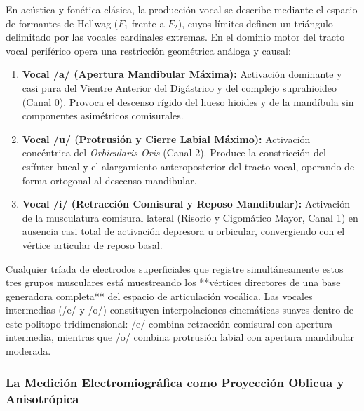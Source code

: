\documentclass[11pt,a4paper,openany]{book}
\theoremstyle{definition}
\begin{document}
En acústica y fonética clásica, la producción vocal se describe mediante el espacio de formantes de Hellwag ($F_1$ frente a $F_2$), cuyos límites definen un triángulo delimitado por las vocales cardinales extremas. En el dominio motor del tracto vocal periférico opera una restricción geométrica análoga y causal:
\begin{enumerate}
    \item \textbf{Vocal /a/ (Apertura Mandibular Máxima):} Activación dominante y casi pura del Vientre Anterior del Digástrico y del complejo suprahioideo (Canal 0). Provoca el descenso rígido del hueso hioides y de la mandíbula sin componentes asimétricos comisurales.
    \item \textbf{Vocal /u/ (Protrusión y Cierre Labial Máximo):} Activación concéntrica del \textit{Orbicularis Oris} (Canal 2). Produce la constricción del esfínter bucal y el alargamiento anteroposterior del tracto vocal, operando de forma ortogonal al descenso mandibular.
    \item \textbf{Vocal /i/ (Retracción Comisural y Reposo Mandibular):} Activación de la musculatura comisural lateral (Risorio y Cigomático Mayor, Canal 1) en ausencia casi total de activación depresora u orbicular, convergiendo con el vértice articular de reposo basal.
\end{enumerate}

Cualquier tríada de electrodos superficiales que registre simultáneamente estos tres grupos musculares está muestreando los **vértices directores de una base generadora completa** del espacio de articulación vocálica. Las vocales intermedias (/e/ y /o/) constituyen interpolaciones cinemáticas suaves dentro de este politopo tridimensional: /e/ combina retracción comisural con apertura intermedia, mientras que /o/ combina protrusión labial con apertura mandibular moderada.

\subsubsection{La Medición Electromiográfica como Proyección Oblicua y Anisotrópica}
\label{subsubsec:medicion_como_proyeccion_oblicua}
\end{document}
